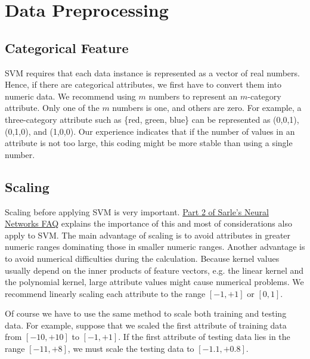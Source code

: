 \documentclass[12pt]{article}
\begin{document}

\section{Data Preprocessing}

\subsection{Categorical Feature}

SVM requires that each data instance is represented as a vector of
real numbers. Hence, if there are categorical attributes, we first
have to convert them into numeric data. We recommend using $m$ numbers
to represent an $m$-category attribute. Only one of the $m$ numbers is
one, and others are zero. For example, a three-category attribute such
as \{red, green, blue\} can be represented as (0,0,1), (0,1,0), and
(1,0,0). Our experience indicates that if the number of values in an
attribute is not too large, this coding might be more stable than
using a single number. 

\subsection{Scaling}
\label{scaling}

Scaling before applying SVM is very
important. \href{ftp://ftp.sas.com/pub/neural/FAQ.html} {Part 2 of
  Sarle's Neural Networks FAQ} \cite{NN01a} explains the importance of
this and most of considerations also apply to SVM. The main advantage
of scaling is to avoid attributes in greater numeric ranges dominating
those in smaller numeric ranges. Another advantage is to avoid
numerical difficulties during the calculation.  Because kernel values
usually depend on the inner products of feature vectors, e.g. the
linear kernel and the polynomial kernel, large attribute values might
cause numerical problems.  We recommend linearly scaling each
attribute to the range $[-1,+1]$ or $[0,1]$.

Of course we have to use the same method to scale both training and
testing data. For example, suppose that we scaled the first attribute
of training data from $[-10, +10]$ to $[-1, +1]$.  If the first
attribute of testing data lies in the range $[-11, +8]$, we must
scale the testing data to $[-1.1, +0.8]$.
\end{document}
